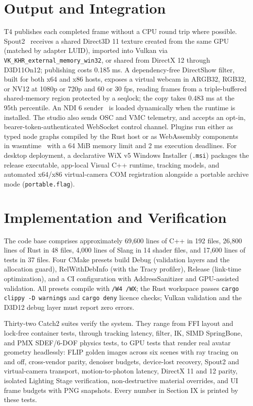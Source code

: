 \documentclass[conference]{IEEEtran}
\begin{document}
\section{Output and Integration}
T4 publishes each completed frame without a CPU round trip where possible. Spout2~\cite{spout} receives a shared Direct3D 11 texture created from the same GPU (matched by adapter LUID), imported into Vulkan via \texttt{VK\_\allowbreak{}KHR\_\allowbreak{}external\_\allowbreak{}memory\_\allowbreak{}win32}, or shared from DirectX 12 through D3D11On12; publishing costs 0.185 ms. A dependency-free DirectShow filter, built for both x64 and x86 hosts, exposes a virtual webcam in ARGB32, RGB32, or NV12 at 1080p or 720p and 60 or 30 fps, reading frames from a triple-buffered shared-memory region protected by a seqlock; the copy takes 0.483 ms at the 95th percentile. An NDI 6 sender~\cite{ndi} is loaded dynamically when the runtime is installed. The studio also sends OSC and VMC telemetry, and accepts an opt-in, bearer-token-authenticated WebSocket control channel. Plugins run either as typed node graphs compiled by the Rust host or as WebAssembly components~\cite{wasm} in wasmtime~\cite{wasmtime} with a 64 MiB memory limit and 2 ms execution deadlines. For desktop deployment, a declarative WiX v5 Windows Installer (\texttt{.msi}) packages the release executable, app-local Visual C++ runtime, tracking models, and automated x64/x86 virtual-camera COM registration alongside a portable archive mode (\texttt{portable.flag}).


\section{Implementation and Verification}
The code base comprises approximately 69,600 lines of C++ in 192 files, 26,800 lines of Rust in 48 files, 4,000 lines of Slang in 14 shader files, and 17,600 lines of tests in 37 files. Four CMake presets build Debug (validation layers and the allocation guard), RelWithDebInfo (with the Tracy profiler), Release (link-time optimization), and a CI configuration with AddressSanitizer and GPU-assisted validation. All presets compile with \texttt{/W4 /WX}; the Rust workspace passes \texttt{cargo clippy -D warnings} and \texttt{cargo deny} licence checks; Vulkan validation and the D3D12 debug layer must report zero errors.

Thirty-two Catch2 suites verify the system. They range from FFI layout and lock-free container tests, through tracking latency, filter, IK, SIMD SpringBone, and PMX SDEF/6-DOF physics tests, to GPU tests that render real avatar geometry headlessly: FLIP golden images across six scenes with ray tracing on and off, cross-vendor parity, denoiser budgets, device-lost recovery, Spout2 and virtual-camera transport, motion-to-photon latency, DirectX 11 and 12 parity, isolated Lighting Stage verification, non-destructive material overrides, and UI frame budgets with PNG snapshots. Every number in Section IX is printed by these tests.
\end{document}
